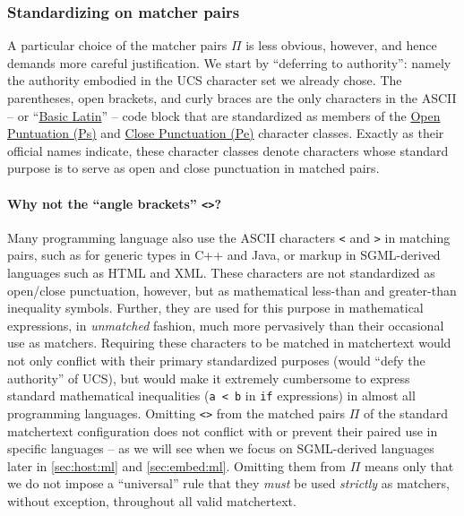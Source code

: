 \subsubsection{Standardizing on matcher pairs}
\label{sec:design:concrete:standard}

A particular choice of the matcher pairs $\Pi$ is less obvious, however,
and hence demands more careful justification.
We start by ``deferring to authority'':
namely the authority embodied in
the UCS character set we already chose.
The parentheses, open brackets, and curly braces
are the only characters in the ASCII --
or ``\href{https://www.compart.com/en/unicode/block/U+0000}{Basic Latin}'' -- 
code block that are standardized as members of the
\href{https://www.compart.com/en/unicode/category/Ps}{Open Puntuation (Ps)}
and 
\href{https://www.compart.com/en/unicode/category/Pe}{Close Punctuation (Pe)}
character classes.
Exactly as their official names indicate,
these character classes denote characters whose standard purpose
is to serve as open and close punctuation in matched pairs.

\paragraph{Why not the ``angle brackets'' \texttt{<>}?}
Many programming language also use the ASCII characters \verb|<| and \verb|>|
in matching pairs,
such as for generic types in C++ and Java,
or markup in SGML-derived languages such as HTML and XML.
These characters are not standardized as open/close punctuation, however,
but as mathematical less-than and greater-than inequality symbols.
Further, they are used for this purpose in mathematical expressions,
in \emph{unmatched} fashion,
much more pervasively than their occasional use as matchers.
Requiring these characters to be matched in matchertext
would not only conflict with their primary standardized purposes
(\ie would ``defy the authority'' of UCS),
but would make it extremely cumbersome to express
standard mathematical inequalities
(\eg \verb|a < b| in \verb|if| expressions)
in almost all programming languages.
Omitting \verb|<>| from the matched pairs $\Pi$
of the standard matchertext configuration does not
conflict with or prevent their paired use in specific languages --
as we will see when we focus on SGML-derived languages later
in \cref{sec:host:ml} and \cref{sec:embed:ml}.
Omitting them from $\Pi$
means only that we do not impose a ``universal'' rule
that they \emph{must} be used \emph{strictly} as matchers,
without exception, throughout all valid matchertext.

